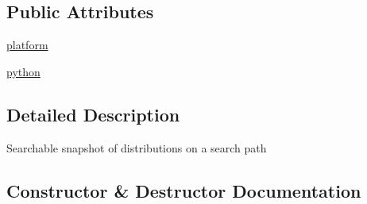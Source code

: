 \subsection*{Public Attributes}
\begin{DoxyCompactItemize}
\item 
\hyperlink{classpkg__resources_1_1Environment_a8512772df91acc77fc4ea47e2d483e7a}{platform}
\item 
\hyperlink{classpkg__resources_1_1Environment_a92643caa8139bba1bd63c32c22d1878c}{python}
\end{DoxyCompactItemize}


\subsection{Detailed Description}
\begin{DoxyVerb}Searchable snapshot of distributions on a search path\end{DoxyVerb}
 

\subsection{Constructor \& Destructor Documentation}
\hypertarget{classpkg__resources_1_1Environment_ac15e05d14e6475ed369db90efc3d350c}{}
